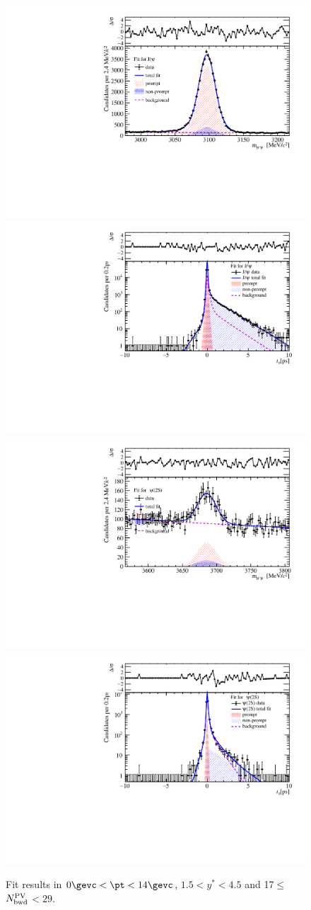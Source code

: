 \begin{figure}[H]
\begin{center}
\includegraphics[width=0.45\linewidth]{pdf/Pbp/BWorkdir/TwoDimFit/ProjMass/Jpsi_n2y1pt1.pdf}
\includegraphics[width=0.45\linewidth]{pdf/Pbp/BWorkdir/TwoDimFit/ProjTz/Jpsi_n2y1pt1.pdf}
\vspace*{-0.5cm}
\includegraphics[width=0.45\linewidth]{pdf/Pbp/BWorkdir/TwoDimFit/ProjMass/Psi2S_n2y1pt1.pdf}
\includegraphics[width=0.45\linewidth]{pdf/Pbp/BWorkdir/TwoDimFit/ProjTz/Psi2S_n2y1pt1.pdf}
\vspace*{-0.5cm}
\end{center}
\caption{Fit results in $0\gevc<\pt<14\gevc$, $1.5<y^*<4.5$ and 17$\leq$$N_{\rm bwd}^{\rm PV}$$<29$.}
\end{figure}
